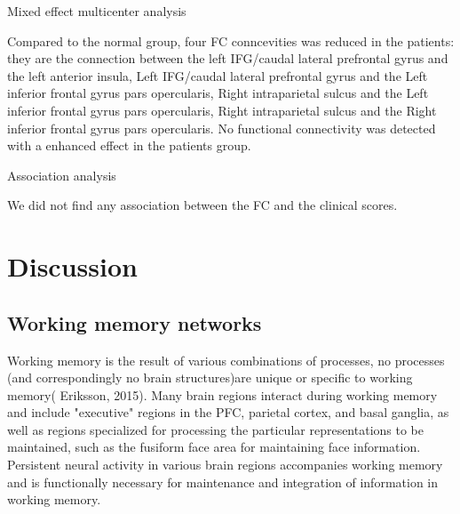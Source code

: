 \documentclass[preprint,authoryear,review,12pt,times]{elsarticle}
\begin{document}
Mixed effect multicenter analysis

Compared to the normal group, four FC conncevities was reduced in the patients: they are the connection between the left IFG/caudal lateral prefrontal gyrus and the left anterior insula, Left IFG/caudal lateral prefrontal gyrus and the Left inferior frontal gyrus pars opercularis, Right intraparietal sulcus and the Left inferior frontal gyrus pars opercularis, Right intraparietal sulcus and the Right inferior frontal gyrus pars opercularis. No functional connectivity was detected with a enhanced effect in the patients group.  


Association analysis

We did not find any association between the FC and the clinical scores.
\section*{Discussion} 

\subsection*{Working memory networks}


Working memory is the result of various combinations of processes, no processes (and correspondingly no brain structures)are unique or specific to working memory( Eriksson, 2015). Many brain regions interact during working memory and include "executive" regions in the PFC, parietal cortex, and basal ganglia, as well as regions specialized for processing the particular representations to be maintained, such as the fusiform face area for maintaining face information. Persistent neural activity in various brain regions accompanies working memory and is functionally necessary for maintenance and integration of information in working memory.
\end{document}
